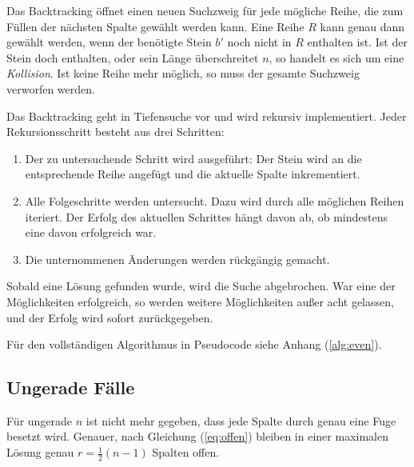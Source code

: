 \documentclass[a4paper, 12pt]{scrartcl}
\begin{document}
Das Backtracking öffnet einen neuen Suchzweig für jede mögliche Reihe, die zum Füllen der nächsten Spalte gewählt werden kann. Eine Reihe $R$ kann genau dann gewählt werden, wenn der benötigte Stein $b'$ noch nicht in $R$ enthalten ist. Ist der Stein doch enthalten, oder sein Länge überschreitet $n$, so handelt es sich um eine \emph{Kollision}. Ist keine Reihe mehr möglich, so muss der gesamte Suchzweig verworfen werden.

Das Backtracking geht in Tiefensuche vor und wird rekursiv implementiert. Jeder Rekursionsschritt besteht aus drei Schritten:
\begin{enumerate}
	\item Der zu untersuchende Schritt wird ausgeführt: Der Stein wird an die entsprechende Reihe angefügt und die aktuelle Spalte inkrementiert.
	\item Alle Folgeschritte werden untersucht. Dazu wird durch alle möglichen Reihen iteriert. Der Erfolg des aktuellen Schrittes hängt davon ab, ob mindestens eine davon erfolgreich war.
	\item Die unternommenen Änderungen werden rückgängig gemacht.
\end{enumerate}
Sobald eine Lösung gefunden wurde, wird die Suche abgebrochen. War eine der Möglichkeiten erfolgreich, so werden weitere Möglichkeiten außer acht gelassen, und der Erfolg wird sofort zurückgegeben.

Für den vollständigen Algorithmus in Pseudocode siehe Anhang (\ref{alg:even}).

\subsection{Ungerade Fälle}
Für ungerade $n$ ist nicht mehr gegeben, dass jede Spalte durch genau eine Fuge besetzt wird. Genauer, nach Gleichung (\ref{eq:offen}) bleiben in einer maximalen Lösung genau $r = \frac{1}{2}(n-1)$ Spalten offen.
\end{document}

